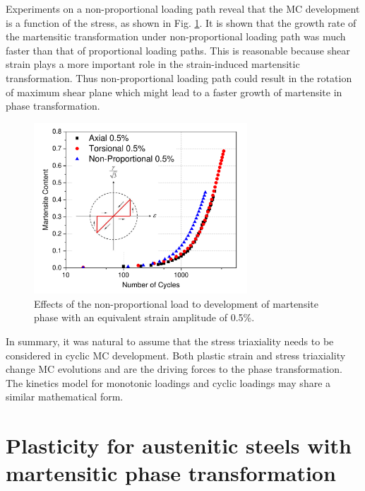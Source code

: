 \documentclass[final,5p,times,onecolumn,10pt,sort&compress]{elsarticle}
\begin{document}
Experiments on a non-proportional loading path reveal that the MC development is a function of the stress, as shown in
Fig. \ref{fig:non-proportional and path}.
It is shown that the growth rate of the martensitic transformation under non-proportional loading path was much faster than that of proportional loading paths. This is reasonable because shear strain plays a more important role in the strain-induced martensitic transformation. Thus non-proportional loading path could result in the rotation of maximum shear plane which might lead to a faster growth of martensite in phase transformation.

\begin{figure}[!h]
  \begin{center}
  \includegraphics[width=8cm]{non-proportional2andpath.pdf}
  \caption{Effects of the non-proportional load to development of martensite phase with an equivalent strain amplitude of 0.5\%.}
  \label{fig:non-proportional and path}
  \end{center}
\end{figure}

In summary, it was natural to assume that the stress triaxiality needs to be considered in cyclic MC development. Both plastic strain and stress triaxiality change MC evolutions and are the driving forces to the phase transformation. The kinetics model for monotonic loadings  and cyclic loadings may share a similar mathematical form.


\section{Plasticity for austenitic steels with martensitic phase transformation}
\end{document}

